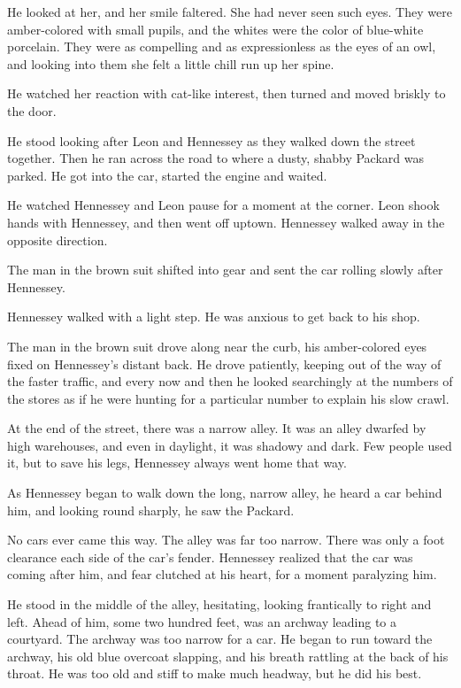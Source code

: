 \documentclass{novel}
\begin{document}
He looked at her, and her smile faltered. She had never seen such eyes. They were amber-colored with small pupils, and the whites were the color of blue-white porcelain. They were as compelling and as expressionless as the eyes of an owl, and looking into them she felt a little chill run up her spine.

He watched her reaction with cat-like interest, then turned and moved briskly to the door.

He stood looking after Leon and Hennessey as they walked down the street together. Then he ran across the road to where a dusty, shabby Packard was parked. He got into the car, started the engine and waited.

He watched Hennessey and Leon pause for a moment at the corner. Leon shook hands with Hennessey, and then went off uptown. Hennessey walked away in the opposite direction.

The man in the brown suit shifted into gear and sent the car rolling slowly after Hennessey.

Hennessey walked with a light step. He was anxious to get back to his shop.

The man in the brown suit drove along near the curb, his amber-colored eyes fixed on Hennessey's distant back. He drove patiently, keeping out of the way of the faster traffic, and every now and then he looked searchingly at the numbers of the stores as if he were hunting for a particular number to explain his slow crawl.

At the end of the street, there was a narrow alley. It was an alley dwarfed by high warehouses, and even in daylight, it was shadowy and dark. Few people used it, but to save his legs, Hennessey always went home that way.

As Hennessey began to walk down the long, narrow alley, he heard a car behind him, and looking round sharply, he saw the Packard.

No cars ever came this way. The alley was far too narrow. There was only a foot clearance each side of the car's fender. Hennessey realized that the car was coming after him, and fear clutched at his heart, for a moment paralyzing him.

He stood in the middle of the alley, hesitating, looking frantically to right and left. Ahead of him, some two hundred feet, was an archway leading to a courtyard. The archway was too narrow for a car. He began to run toward the archway, his old blue overcoat slapping, and his breath rattling at the back of his throat. He was too old and stiff to make much headway, but he did his best.
\end{document}
